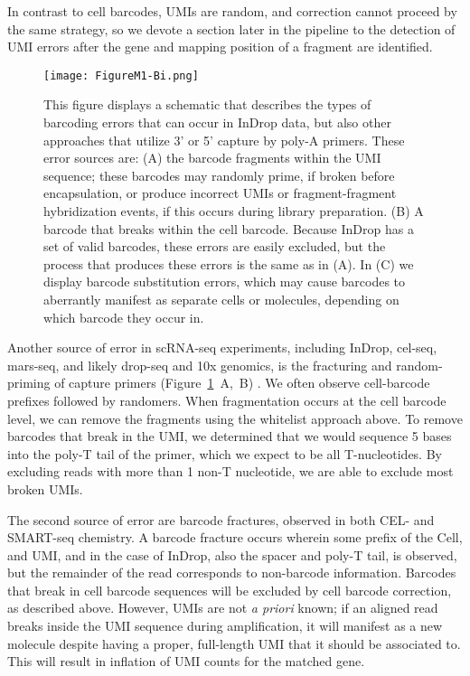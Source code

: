 In contrast to cell barcodes, UMIs are random, and correction cannot proceed by the same strategy, so we devote a section later in the pipeline to the detection of UMI errors after the gene and mapping position of a fragment are identified.

\begin{figure}
\centering
\texttt{[image: FigureM1-Bi.png]}
\caption{This figure displays a schematic that describes the types of barcoding errors that can occur in InDrop data, but also other approaches that utilize 3' or 5' capture by poly-A primers. These error sources are: (A) the barcode fragments within the UMI sequence; these barcodes may randomly prime, if broken before encapsulation, or produce incorrect UMIs or fragment-fragment hybridization events, if this occurs during library preparation. (B) A barcode that breaks within the cell barcode. Because InDrop has a set of valid barcodes, these errors are easily excluded, but the process that produces these errors is the same as in (A). In (C) we display barcode substitution errors, which may cause barcodes to aberrantly manifest as separate cells or molecules, depending on which barcode they occur in.}
\label{fig:m1bi}
\end{figure}

Another source of error in scRNA-seq experiments, including InDrop, cel-seq, mars-seq, and likely drop-seq and 10x genomics, is the fracturing and random-priming of capture primers (Figure~\ref{fig:m1bi}~A,~B) \citep{Jaitin2014}. 
We often observe cell-barcode prefixes followed by randomers. 
When fragmentation occurs at the cell barcode level, we can remove the fragments using the whitelist approach above. To remove barcodes that break in the UMI, we determined that we would sequence 5 bases into the poly-T tail of the primer, which we expect to be all T-nucleotides. 
By excluding reads with more than 1 non-T nucleotide, we are able to exclude most broken UMIs.

The second source of error are barcode fractures, observed in both CEL- and SMART-seq chemistry. %
A barcode fracture occurs wherein some prefix of the Cell, and UMI, and in the case of InDrop, also the spacer and poly-T tail, is observed, but the remainder of the read corresponds to non-barcode information. 
Barcodes that break in cell barcode sequences will be excluded by cell barcode correction, as described above. 
However, UMIs are not \textit{a priori} known; if an aligned read breaks inside the UMI sequence during amplification, it will manifest as a new molecule despite having a proper, full-length UMI that it should be associated to.
This will result in inflation of UMI counts for the matched gene. 

